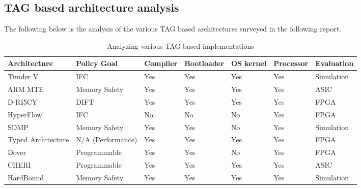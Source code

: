 



\subsection{TAG based architecture analysis}
The following below is the analysis of the various TAG based architectures surveyed in the following report.
\begin{landscape}
\begin{table}[]
  \centering
  \caption{Analyzing various TAG-based implementations}
  \begin{tabular}{@{}lllllll@{}}
  \toprule
  \textbf{Architecture} & \textbf{Policy Goal} & \textbf{Complier} & \textbf{Bootloader} & \textbf{OS kernel} & \textbf{Processor} & \textbf{Evaluation} \\ \midrule
  Timder V              & IFC                  & Yes               & Yes                 & Yes                & Yes                & Simulation          \\
  ARM MTE               & Memory Safety        & Yes               & Yes                 & Yes                & Yes                & ASIC                \\
  D-RI5CY               & DIFT                 & Yes               & Yes                 & Yes                & Yes                & FPGA                \\
  HyperFlow             & IFC                  & No                & No                  & No                 & Yes                & FPGA                \\
  SDMP                  & Memory Safety        & Yes               & Yes                 & No                 & Yes                & Simulation          \\
  Typed Architecture    & N/A (Performance)    & Yes               & Yes                 & Yes                & Yes                & FPGA                \\
  Dover                 & Programmable         & Yes               & Yes                 & No                 & Yes                & FPGA                \\
  CHERI                 & Programmable         & Yes               & Yes                 & Yes                & Yes                & ASIC                \\
  HardBound             & Memory Safety        & Yes               & Yes                 & Yes                & Yes                & Simulation          \\ \bottomrule
  \end{tabular}
  \end{table}
\end{landscape}

